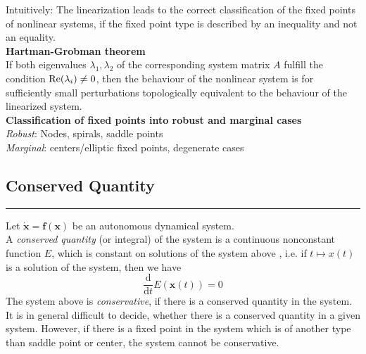 Intuitively: The linearization leads to the correct classification of the fixed points of nonlinear systems, if the fixed point type is described by an inequality and not an equality.\\

\textbf{Hartman-Grobman theorem}\\
If both eigenvalues $\lambda_1, \lambda_2$ of the corresponding system matrix $A$ fulfill the condition $\textup{Re}(\lambda_i) \neq 0$, then the behaviour of the nonlinear system is for sufficiently small perturbations topologically equivalent to the behaviour of the linearized system.\\

\textbf{Classification of fixed points into robust and marginal cases}\\
\emph{Robust}: Nodes, spirals, saddle points\\
\emph{Marginal}: centers/elliptic fixed points, degenerate cases

\subsection{Conserved Quantity}
\noindent\rule[\linienAbstand]{\linewidth}{\linienDicke}
Let $\dot{\textbf{x}} = \textbf{f}(\textbf{x})$ be an autonomous dynamical system.\\
A \emph{conserved quantity} (or integral) of the system is a continuous nonconstant function $E$, which is constant on solutions of the system above , i.e. if $t \mapsto x(t)$ is a solution of the system, then we have
\begin{equation}
  \frac{\mathrm{d} }{\mathrm{d} t} E(\textbf{x}(t)) = 0
\end{equation}
The system above is \emph{conservative}, if there is a conserved quantity in the system.\\

It is in general difficult to decide, whether there is a conserved quantity in a given system.
However, if there is a fixed point in the system which is of another type than saddle point or center, the system cannot be conservative.\\


